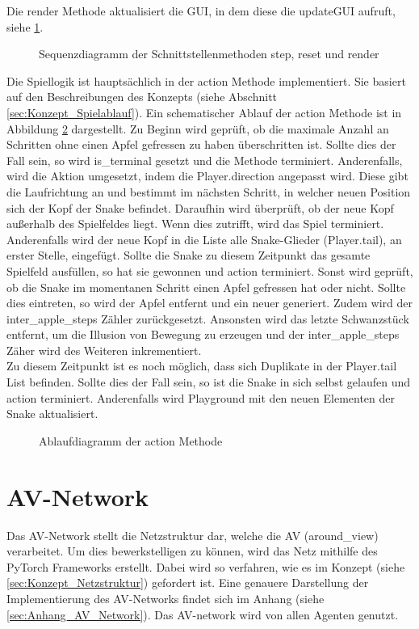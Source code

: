 Die render Methode aktualisiert die GUI, in dem diese die updateGUI aufruft, siehe \ref{fig:Implementierung_Sequenzdiagram}.
\begin{figure}[H]
	\centering
	\def\svgscale{0.110}
	
	\caption[Sequenzdiagram]{Sequenzdiagramm der Schnittstellenmethoden step, reset und render}
	\label{fig:Implementierung_Sequenzdiagram}
\end{figure}
Die Spiellogik ist hauptsächlich in der action Methode implementiert. Sie basiert auf den Beschreibungen des Konzepts (siehe Abschnitt \ref{sec:Konzept_Spielablauf}). Ein schematischer Ablauf der action Methode ist in Abbildung \ref{fig:Implementierung_action_method} dargestellt. 
Zu Beginn wird geprüft, ob die maximale Anzahl an Schritten ohne einen Apfel gefressen zu haben überschritten ist. Sollte dies der Fall sein, so wird is\_terminal gesetzt und die Methode terminiert. Anderenfalls, wird die Aktion umgesetzt, indem die Player.direction angepasst wird. Diese gibt die Laufrichtung an und bestimmt im nächsten Schritt, in welcher neuen Position sich der Kopf der Snake befindet. Daraufhin wird überprüft, ob der neue Kopf außerhalb des Spielfeldes liegt. Wenn dies zutrifft, wird das Spiel terminiert.
Anderenfalls wird der neue Kopf in die Liste alle Snake-Glieder (Player.tail), an erster Stelle, eingefügt. Sollte die Snake zu diesem Zeitpunkt das gesamte Spielfeld ausfüllen, so hat sie gewonnen und action terminiert. Sonst wird geprüft, ob die Snake im momentanen Schritt einen Apfel gefressen hat oder nicht. Sollte dies eintreten, so wird der Apfel entfernt und ein neuer generiert. Zudem wird der inter\_apple\_steps Zähler zurückgesetzt. Ansonsten wird das letzte Schwanzstück entfernt, um die Illusion von Bewegung zu erzeugen und der inter\_apple\_steps Zäher wird des Weiteren inkrementiert.\\
Zu diesem Zeitpunkt ist es noch möglich, dass sich Duplikate in der Player.tail List befinden. Sollte dies der Fall sein, so ist die Snake in sich selbst gelaufen und action terminiert. Anderenfalls wird Playground mit den neuen Elementen der Snake aktualisiert.
\begin{figure}[H]
	\centering
	\def\svgscale{0.095}
	
	\caption[Ablaufdiagramm der action Methode]{Ablaufdiagramm der action Methode}
	\label{fig:Implementierung_action_method}
\end{figure}

\section{AV-Network} \label{sec:Implementierung_AV_Network}
Das AV-Network stellt die Netzstruktur dar, welche die AV (around\_view) verarbeitet. Um dies bewerkstelligen zu können, wird das Netz mithilfe des PyTorch Frameworks erstellt. Dabei wird so verfahren, wie es im Konzept (siehe \ref{sec:Konzept_Netzstruktur}) gefordert ist. Eine genauere Darstellung der Implementierung des AV-Networks findet sich im Anhang (siehe \ref{sec:Anhang_AV_Network}). Das AV-network wird von allen Agenten genutzt.

